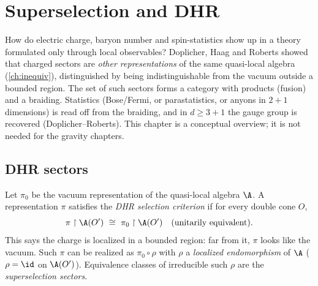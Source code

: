 \chapter{Superselection and DHR}\label{ch:dhr}
\skippable

\begin{physmotiv}
How do electric charge, baryon number and spin-statistics show up in a theory formulated only through local observables? Doplicher, Haag and Roberts showed that charged sectors are \emph{other representations} of the same quasi-local algebra (\cref{ch:inequiv}), distinguished by being indistinguishable from the vacuum outside a bounded region. The set of such sectors forms a category with products (fusion) and a braiding. Statistics (Bose/Fermi, or parastatistics, or anyons in $2+1$ dimensions) is read off from the braiding, and in $d\ge3+1$ the gauge group is recovered (Doplicher--Roberts). This chapter is a conceptual overview; it is not needed for the gravity chapters.
\end{physmotiv}

\section{DHR sectors}

Let $\pi_0$ be the vacuum representation of the quasi-local algebra $\A$. A representation $\pi$ satisfies the \emph{DHR selection criterion} if for every double cone $O$,
\begin{equation}
\pi\restriction\A(O')\ \cong\ \pi_0\restriction\A(O')\quad\text{(unitarily equivalent)}.
\end{equation}
This says the charge is localized in a bounded region: far from it, $\pi$ looks like the vacuum. Such $\pi$ can be realized as $\pi_0\circ\rho$ with $\rho$ a \emph{localized endomorphism} of $\A$ ($\rho=\id$ on $\A(O')$). Equivalence classes of irreducible such $\rho$ are the \emph{superselection sectors}.

